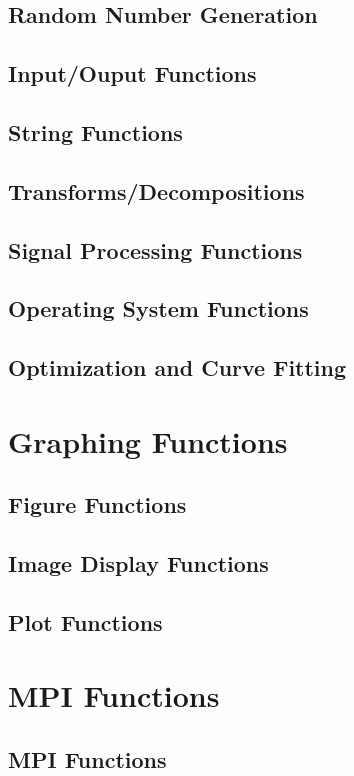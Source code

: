 \documentclass{book}
\begin{document}
\section{Random Number Generation}

\section{Input/Ouput Functions}

\section{String Functions}

\section{Transforms/Decompositions}

\section{Signal Processing Functions}

\section{Operating System Functions}

\section{Optimization and Curve Fitting}

\chapter{Graphing Functions}
\section{Figure Functions}

\section{Image Display Functions}

\section{Plot Functions}

\chapter{MPI Functions}
\section{MPI Functions}

\end{document}
